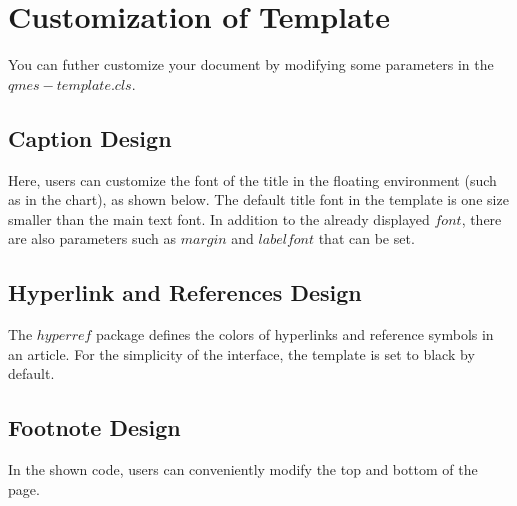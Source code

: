 \documentclass{qmes-template}
\begin{document}
\section{Customization of Template}
You can futher customize your document by modifying some parameters in the $qmes-template.cls$.

\subsection{Caption Design}
Here, users can customize the font of the title in the floating environment (such as in the chart), as shown below. The default title font in the template is one size smaller than the main text font. In addition to the already displayed $font$, there are also parameters such as $margin$ and $labelfont$ that can be set.

\subsection{Hyperlink and References Design}
The $hyperref$ package defines the colors of hyperlinks and reference symbols in an article. For the simplicity of the interface, the template is set to black by default.

\subsection{Footnote Design}
In the shown code, users can conveniently modify the top and bottom of the page.
\end{document}
